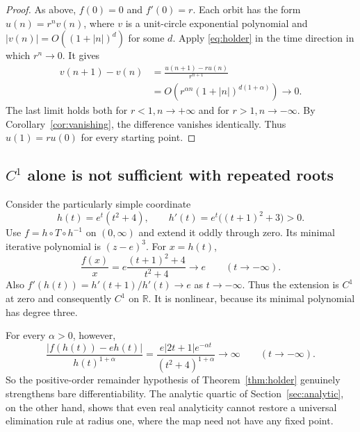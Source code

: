 \documentclass[11pt,letterpaper]{article}
\theoremstyle{definition}
\theoremstyle{remark}
\newcommand{\R}{\mathbb R}
\begin{document}
\begin{proof}
As above, $f(0)=0$ and $f'(0)=r$. Each orbit has the form
$u(n)=r^nv(n)$, where $v$ is a unit-circle exponential polynomial and
$|v(n)|=O((1+|n|)^d)$ for some $d$. Apply \eqref{eq:holder} in the time
direction in which $r^n\to0$. It gives
\begin{align}
 v(n+1)-v(n)
 &=\frac{u(n+1)-ru(n)}{r^{n+1}}\\
 &=O\!\left(r^{\alpha n}(1+|n|)^{d(1+\alpha)}\right)\longrightarrow0.
 \label{eq:holderdecay}
\end{align}
The last limit holds both for $r<1,n\to+\infty$ and for
$r>1,n\to-\infty$. By Corollary~\ref{cor:vanishing}, the difference
vanishes identically. Thus $u(1)=ru(0)$ for every starting point.
\end{proof}

\subsection{\texorpdfstring{$C^1$}{C1} alone is not sufficient with repeated roots}

Consider the particularly simple coordinate
\begin{equation}
 h(t)=e^t(t^2+4),\qquad
 h'(t)=e^t\bigl((t+1)^2+3\bigr)>0.
 \label{eq:C1H}
\end{equation}
Use $f=h\circ T\circ h^{-1}$ on $(0,\infty)$ and extend it oddly through
zero. Its minimal iterative polynomial is $(z-e)^3$.
For $x=h(t)$,
\begin{equation}
 \frac{f(x)}x
  =e\frac{(t+1)^2+4}{t^2+4}\longrightarrow e
       \qquad(t\to-\infty).
\end{equation}
Also $f'(h(t))=h'(t+1)/h'(t)\to e$ as $t\to-\infty$.
Thus the extension is $C^1$ at zero and consequently $C^1$ on $\R$.
It is nonlinear, because its minimal polynomial has degree three.

For every $\alpha>0$, however,
\begin{equation}
 \frac{|f(h(t))-eh(t)|}{h(t)^{1+\alpha}}
 =\frac{e|2t+1|e^{-\alpha t}}{(t^2+4)^{1+\alpha}}
 \longrightarrow\infty\qquad(t\to-\infty).
 \label{eq:notHolder}
\end{equation}
So the positive-order remainder hypothesis of
Theorem~\ref{thm:holder} genuinely strengthens bare differentiability.
The analytic quartic of Section~\ref{sec:analytic}, on the other hand,
shows that even real analyticity cannot restore a universal elimination
rule at radius one, where the map need not have any fixed point.
\end{document}
